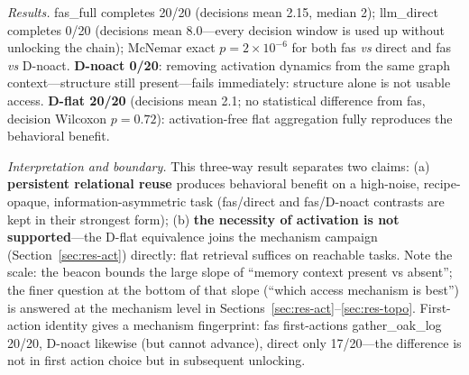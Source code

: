 \documentclass[10pt,a4paper]{article}
\begin{document}
\emph{Results.} fas\_full completes 20/20 (decisions mean 2.15, median 2); llm\_direct completes 0/20 (decisions mean 8.0---every decision window is used up without unlocking the chain); McNemar exact $p{=}2\times10^{-6}$ for both fas \emph{vs} direct and fas \emph{vs} D-noact. \textbf{D-noact 0/20}: removing activation dynamics from the same graph context---structure still present---fails immediately: structure alone is not usable access. \textbf{D-flat 20/20} (decisions mean 2.1; no statistical difference from fas, decision Wilcoxon $p{=}0.72$): activation-free flat aggregation fully reproduces the behavioral benefit.

\emph{Interpretation and boundary.} This three-way result separates two claims: (a) \textbf{persistent relational reuse} produces behavioral benefit on a high-noise, recipe-opaque, information-asymmetric task (fas/direct and fas/D-noact contrasts are kept in their strongest form); (b) \textbf{the necessity of activation is not supported}---the D-flat equivalence joins the mechanism campaign (Section~\ref{sec:res-act}) directly: flat retrieval suffices on reachable tasks. Note the scale: the beacon bounds the large slope of ``memory context present vs absent''; the finer question at the bottom of that slope (``which access mechanism is best'') is answered at the mechanism level in Sections~\ref{sec:res-act}--\ref{sec:res-topo}. First-action identity gives a mechanism fingerprint: fas first-actions gather\_oak\_log 20/20, D-noact likewise (but cannot advance), direct only 17/20---the difference is not in first action choice but in subsequent unlocking.
\end{document}

